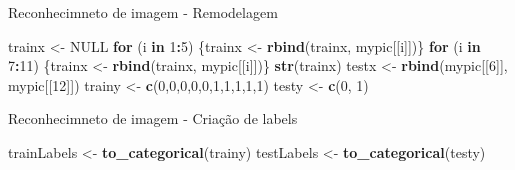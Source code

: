 \documentclass[
  ignorenonframetext,
]{beamer}
\newenvironment{Shaded}{\begin{snugshade}}{\end{snugshade}}
\newcommand{\ControlFlowTok}[1]{\textcolor[rgb]{0.13,0.29,0.53}{\textbf{#1}}}
\newcommand{\DecValTok}[1]{\textcolor[rgb]{0.00,0.00,0.81}{#1}}
\newcommand{\KeywordTok}[1]{\textcolor[rgb]{0.13,0.29,0.53}{\textbf{#1}}}
\newcommand{\NormalTok}[1]{#1}
\newcommand{\OperatorTok}[1]{\textcolor[rgb]{0.81,0.36,0.00}{\textbf{#1}}}
\newcommand{\OtherTok}[1]{\textcolor[rgb]{0.56,0.35,0.01}{#1}}
\newcommand{\StringTok}[1]{\textcolor[rgb]{0.31,0.60,0.02}{#1}}
\begin{document}
\begin{frame}[fragile]{Reconhecimneto de imagem - Remodelagem}
\protect\hypertarget{reconhecimneto-de-imagem---remodelagem}{}

\begin{Shaded}
\begin{Highlighting}[]
\NormalTok{trainx <-}\StringTok{ }\OtherTok{NULL}
\ControlFlowTok{for}\NormalTok{ (i }\ControlFlowTok{in} \DecValTok{1}\OperatorTok{:}\DecValTok{5}\NormalTok{) \{trainx <-}\StringTok{ }\KeywordTok{rbind}\NormalTok{(trainx, mypic[[i]])\}}
\ControlFlowTok{for}\NormalTok{ (i }\ControlFlowTok{in} \DecValTok{7}\OperatorTok{:}\DecValTok{11}\NormalTok{) \{trainx <-}\StringTok{ }\KeywordTok{rbind}\NormalTok{(trainx, mypic[[i]])\}}
\KeywordTok{str}\NormalTok{(trainx)}
\NormalTok{testx <-}\StringTok{ }\KeywordTok{rbind}\NormalTok{(mypic[[}\DecValTok{6}\NormalTok{]], mypic[[}\DecValTok{12}\NormalTok{]])}
\NormalTok{trainy <-}\StringTok{ }\KeywordTok{c}\NormalTok{(}\DecValTok{0}\NormalTok{,}\DecValTok{0}\NormalTok{,}\DecValTok{0}\NormalTok{,}\DecValTok{0}\NormalTok{,}\DecValTok{0}\NormalTok{,}\DecValTok{1}\NormalTok{,}\DecValTok{1}\NormalTok{,}\DecValTok{1}\NormalTok{,}\DecValTok{1}\NormalTok{,}\DecValTok{1}\NormalTok{)}
\NormalTok{testy <-}\StringTok{ }\KeywordTok{c}\NormalTok{(}\DecValTok{0}\NormalTok{, }\DecValTok{1}\NormalTok{)}
\end{Highlighting}
\end{Shaded}

\end{frame}

\begin{frame}[fragile]{Reconhecimneto de imagem - Criação de labels}
\protect\hypertarget{reconhecimneto-de-imagem---criauxe7uxe3o-de-labels}{}

\begin{Shaded}
\begin{Highlighting}[]
\NormalTok{trainLabels <-}\StringTok{ }\KeywordTok{to_categorical}\NormalTok{(trainy)}
\NormalTok{testLabels <-}\StringTok{ }\KeywordTok{to_categorical}\NormalTok{(testy)}
\end{Highlighting}
\end{Shaded}

\end{frame}
\end{document}
